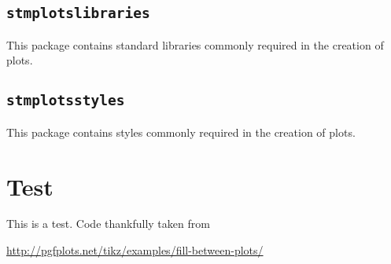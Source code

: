 \documentclass[%
  type=article,%
  layout=koma,%
  date=true,%
  hyperref=true,%
  listings=true,%
  math=true,%
  plots=false,%
]{stmtext}
\begin{document}
\subsection{\protect\texttt{stmplotslibraries}}
\label{sec:usage:preamble:libraries}


This package contains standard libraries commonly required in the creation of plots.


\subsection{\protect\texttt{stmplotsstyles}}
\label{sec:usage:preamble:styles}


This package contains styles commonly required in the creation of plots.


\section{Test}

This is a test. Code thankfully taken from

\href{http://pgfplots.net/tikz/examples/fill-between-plots/}{http://pgfplots.net/tikz/examples/fill-between-plots/}
\end{document}
